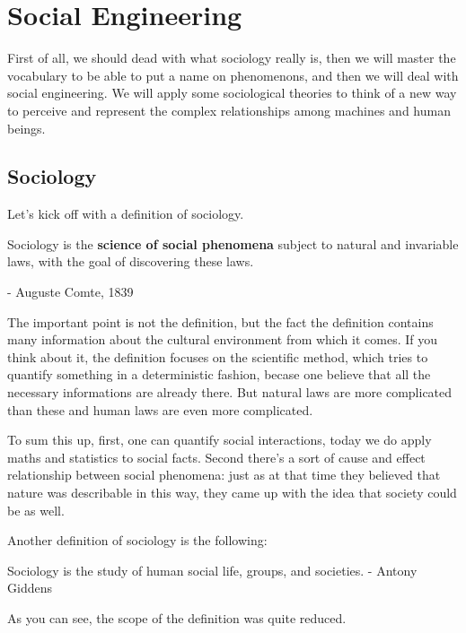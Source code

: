 \chapter{Social Engineering}
First of all, we should dead with what sociology really is, then we
will master the vocabulary to be able to put a name on phenomenons,
and then we will deal with social engineering. We will apply some
sociological theories to think of a new way to perceive and represent
the complex relationships among machines and human beings.
\section{Sociology}
Let's kick off with a definition of sociology.

\begin{boxH}
  Sociology is the \textbf{science of social phenomena} subject to
  natural and invariable laws, with the goal of discovering these
  laws.

  - Auguste Comte, 1839
\end{boxH}
The important point is not the definition, but the fact the definition
contains many information about the cultural environment from which it
comes. If you think about it, the definition focuses on the scientific
method, which tries to quantify something in a deterministic fashion,
becase one believe that all the necessary informations are already
there. But natural laws are more complicated than these and human laws
are even more complicated. 

To sum this up, first, one can quantify social interactions, today we
do apply maths and statistics to social facts. Second there's a sort
of cause and effect relationship between social phenomena: just as at
that time they believed that nature was describable in this way, they
came up with the idea that society could be as well.

Another definition of sociology is the following:
\begin{boxH}
  Sociology is the study of human social life, groups, and societies.
  - Antony Giddens
\end{boxH}
As you can see, the scope of the definition was quite reduced.

